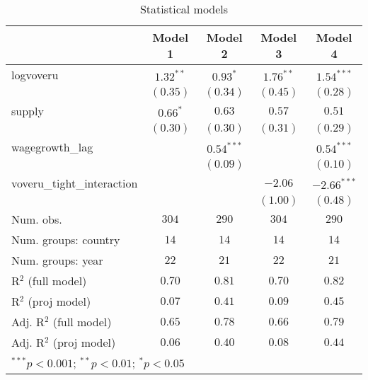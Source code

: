 
\begin{table}
\begin{center}
\begin{tabular}{l c c c c}
\hline
 & Model 1 & Model 2 & Model 3 & Model 4 \\
\hline
logvoveru                  & $1.32^{**}$ & $0.93^{*}$   & $1.76^{**}$ & $1.54^{***}$  \\
                           & $(0.35)$    & $(0.34)$     & $(0.45)$    & $(0.28)$      \\
supply                     & $0.66^{*}$  & $0.63$       & $0.57$      & $0.51$        \\
                           & $(0.30)$    & $(0.30)$     & $(0.31)$    & $(0.29)$      \\
wagegrowth\_lag            &             & $0.54^{***}$ &             & $0.54^{***}$  \\
                           &             & $(0.09)$     &             & $(0.10)$      \\
voveru\_tight\_interaction &             &              & $-2.06$     & $-2.66^{***}$ \\
                           &             &              & $(1.00)$    & $(0.48)$      \\
\hline
Num. obs.                  & $304$       & $290$        & $304$       & $290$         \\
Num. groups: country       & $14$        & $14$         & $14$        & $14$          \\
Num. groups: year          & $22$        & $21$         & $22$        & $21$          \\
R$^2$ (full model)         & $0.70$      & $0.81$       & $0.70$      & $0.82$        \\
R$^2$ (proj model)         & $0.07$      & $0.41$       & $0.09$      & $0.45$        \\
Adj. R$^2$ (full model)    & $0.65$      & $0.78$       & $0.66$      & $0.79$        \\
Adj. R$^2$ (proj model)    & $0.06$      & $0.40$       & $0.08$      & $0.44$        \\
\hline
\multicolumn{5}{l}{\scriptsize{$^{***}p<0.001$; $^{**}p<0.01$; $^{*}p<0.05$}}
\end{tabular}
\caption{Statistical models}
\label{table:coefficients}
\end{center}
\end{table}
